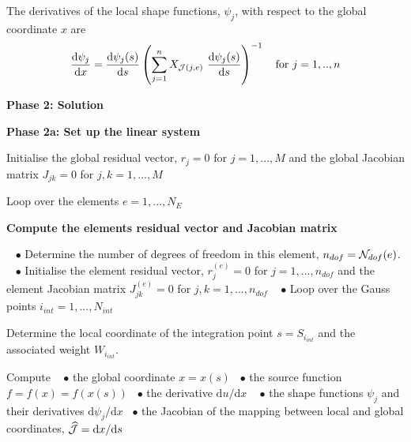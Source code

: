 \begin{DoxyItemize}
The derivatives of the local shape functions, $ \psi_j $, with respect to the global coordinate $ x $ are \[ \frac{\mbox{d} \psi_j}{\mbox{d} x} = \frac{\mbox{d} \psi_j(s)}{\mbox{d} s} \left(\sum_{j=1}^n X_{{\cal J}(j,e)} \ \frac{\mbox{d} \psi_j(s)}{\mbox{d} s} \right)^{-1} \mbox{\ \ \ for $j=1,..,n$} \]

{\bfseries  Phase 2\+: Solution }

{\bfseries  Phase 2a\+: Set up the linear system }
\item Initialise the global residual vector, $ r_j=0 $ for $j=1,...,M $ and the global Jacobian matrix $ J_{jk}=0 $ for $j,k=1,...,M $
\item Loop over the elements $ e=1,...,N_E$ ~\newline
~\newline
 \begin{center} {\bfseries  Compute the element\textquotesingle{}s residual vector and Jacobian matrix } \end{center}  ~\newline
 $ \bullet $ Determine the number of degrees of freedom in this element, $ n_{dof}={\cal N}_{dof}(e) $. ~\newline
 $ \bullet $ Initialise the element residual vector, $ r_{j}^{(e)}=0 $ for $j=1,...,n_{dof} $ and the element Jacobian matrix $ J_{jk}^{(e)}=0 $ for $j,k=1,...,n_{dof} $ ~\newline
 $ \bullet $ Loop over the Gauss points $ i_{int}=1,...,N_{int}$ ~\newline

\begin{DoxyItemize}
\item Determine the local coordinate of the integration point $ s = S_{i_{int}} $ and the associated weight $W_{i_{int}}.$
\item Compute ~\newline
 $ \bullet $ the global coordinate $ x = x(s) $~\newline
 $ \bullet $ the source function $ f = f(x) =f(x(s)) $~\newline
 $ \bullet $ the derivative $ \mbox{d} u/\mbox{d} x $ ~\newline
 $ \bullet $ the shape functions $ \psi_j $ and their derivatives $ \mbox{d} \psi_j/\mbox{d} x $~\newline
 $ \bullet $ the Jacobian of the mapping between local and global coordinates, $ \widehat{\cal J} = \mbox{d} x/\mbox{d} s$~\newline


\end{DoxyItemize}
\end{DoxyItemize}
